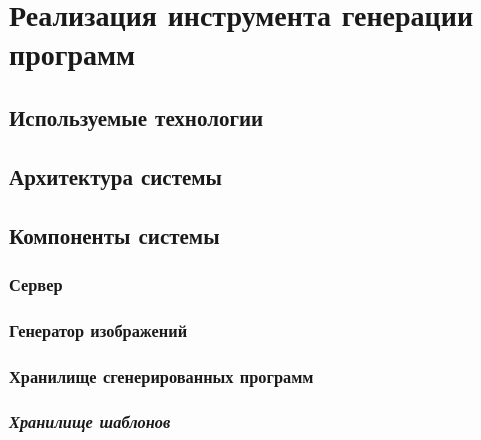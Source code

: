 \section{Реализация инструмента генерации программ}

\subsection{Используемые технологии}
\subsection{Архитектура системы}
\begin{figure}[ht]
    \begin{center}
    \end{center}
\end{figure}
\clearpage
\subsection{Компоненты системы}
\subsubsection{Сервер}
\subsubsection{Генератор изображений}
\subsubsection{Хранилище сгенерированных программ}
\subsubsection{\textit{Хранилище шаблонов}}
